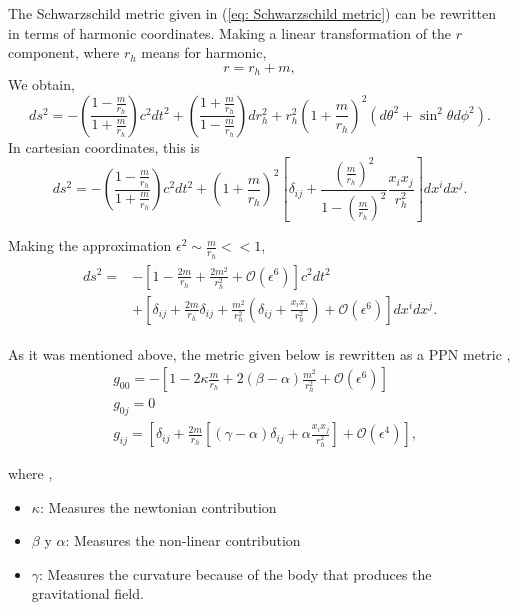 The Schwarzschild metric given in (\ref{eq: Schwarzschild metric}) can be rewritten in terms of harmonic coordinates. Making a linear transformation of the $r$ component, where $r_h$ means for harmonic,
\begin{equation*}
	r = r_h+m,
\end{equation*}
We obtain,
\begin{equation*}
	ds^2 = -\left(\frac{1-\frac{m}{r_h}}{1+\frac{m}{r_h}}\right) c^2 dt^2 + \left(\frac{1+\frac{m}{r_h}}{1-\frac{m}{r_h}}\right) dr_h^2 + r_h ^2 \left(1+\frac{m}{r_h}\right)^{2} (d\theta^2 + \sin^2\theta d\phi^2).
\end{equation*}
In cartesian coordinates, this is
\begin{equation}
	ds^2 = -\left(\frac{1-\frac{m}{r_h}}{1+\frac{m}{r_h}}\right) c^2 dt^2 + \left(1+\frac{m}{r_h}\right)^{2} \left[\delta_{ij}+\frac{\left(\frac{m}{r_h}\right)^2}{1-\left(\frac{m}{r_h}\right)^2}\frac{x_ix_j}{r_h^2}\right]dx^idx^j.
\end{equation}

Making the approximation $\epsilon^2 \sim \frac{m}{r_h}<<1$, 
\begin{align}
 \begin{split}
ds^2 =& -\left[1-\frac{2m}{r_h}+\frac{2m^2}{r_h^2}+\mathcal{O}(\epsilon^6)\right]c^2 dt^2 \\
&+ \left[\delta_{ij}+\frac{2m}{r_h}\delta_{ij}+\frac{m^2}{r_h^2}\left(\delta_{ij}+\frac{x_ix_j}{r_h^2}\right)+\mathcal{O}(\epsilon^6)\right]dx^idx^j.
\end{split}
\end{align}

As it was mentioned above, the metric given below is rewritten as a PPN metric \cite{Brumberg},
\begin{subequations}
\label{eq:gmetricppn}
\begin{align}
&g_{00} =  -\left[1-2\kappa\frac{m}{r_h}+2(\beta-\alpha)\frac{m^2}{r_h^2}+\mathcal{O}(\epsilon^6)\right]\\
&g_{0j} =  0\\
&g_{ij} = \left[\delta_{ij}+\frac{2m}{r_h}\left[(\gamma-\alpha)\delta_{ij}+\alpha\frac{x_ix_j}{r_h^2}\right]+\mathcal{O}(\epsilon^4)\right],
\end{align}
\end{subequations}

where \cite{GravityPoisson},
\begin{itemize}
\item $\kappa$: Measures the newtonian contribution
\item $\beta$ y $\alpha$: Measures the non-linear contribution
\item $\gamma$:  Measures the curvature because of the body that produces the gravitational field.
\end{itemize}


